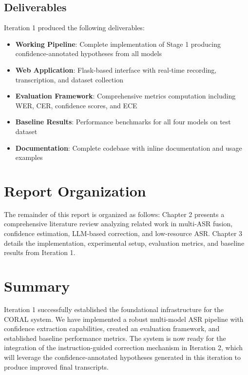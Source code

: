 \subsection{Deliverables}

Iteration 1 produced the following deliverables:

\begin{itemize}
    \item \textbf{Working Pipeline}: Complete implementation of Stage 1 producing confidence-annotated hypotheses from all models
    \item \textbf{Web Application}: Flask-based interface with real-time recording, transcription, and dataset collection
    \item \textbf{Evaluation Framework}: Comprehensive metrics computation including WER, CER, confidence scores, and ECE
    \item \textbf{Baseline Results}: Performance benchmarks for all four models on test dataset
    \item \textbf{Documentation}: Complete codebase with inline documentation and usage examples
\end{itemize}

\section{Report Organization}

The remainder of this report is organized as follows: Chapter 2 presents a comprehensive literature review analyzing related work in multi-ASR fusion, confidence estimation, LLM-based correction, and low-resource ASR. Chapter 3 details the implementation, experimental setup, evaluation metrics, and baseline results from Iteration 1.

\section{Summary}

Iteration 1 successfully established the foundational infrastructure for the CORAL system. We have implemented a robust multi-model ASR pipeline with confidence extraction capabilities, created an evaluation framework, and established baseline performance metrics. The system is now ready for the integration of the instruction-guided correction mechanism in Iteration 2, which will leverage the confidence-annotated hypotheses generated in this iteration to produce improved final transcripts.
